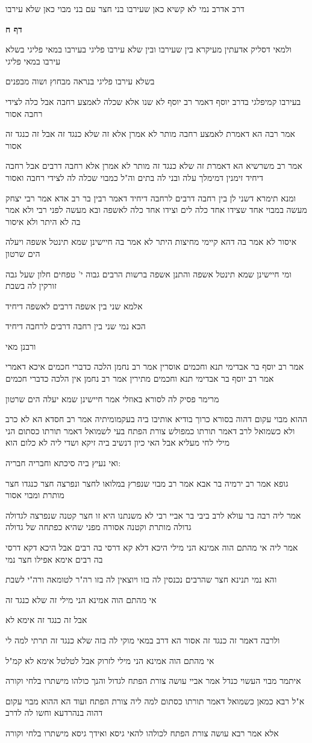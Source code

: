 \documentclass[12pt, openany]{book}
\newcommand{\sethebfont}{
\fontsize{10.5pt}{21.0pt} \selectfont
}
\newcommand{\textblock}[1]{
{\sethebfont #1\\}	
}
\newcommand{\sectname}{}
\newcommand{\newsection}[1]{
	\addcontentsline{toc}{section}{#1}
	\renewcommand{\sectname}{#1}	
	\vspace{-\baselineskip}
	\begin{center}
		\textbf{%
\fontsize{16pt}{16pt}\selectfont
			#1}
	\end{center}
	\vspace{-\baselineskip}
	\nopagebreak
}
\begin{document}
\textblock{דרב אדרב נמי לא קשיא כאן שעירבו בני חצר עם בני מבוי כאן שלא עירבו}
\newsection{דף ח}
\textblock{ולמאי דסליק אדעתין מעיקרא בין שעירבו ובין שלא עירבו פליגי בעירבו במאי פליגי בשלא עירבו במאי פליגי}
\textblock{בשלא עירבו פליגי בנראה מבחוץ ושוה מבפנים}
\textblock{בעירבו קמיפלגי בדרב יוסף דאמר רב יוסף לא שנו אלא שכלה לאמצע רחבה אבל כלה לצידי רחבה אסור}
\textblock{אמר רבה הא דאמרת לאמצע רחבה מותר לא אמרן אלא זה שלא כנגד זה אבל זה כנגד זה אסור}
\textblock{אמר רב משרשיא הא דאמרת זה שלא כנגד זה מותר לא אמרן אלא רחבה דרבים אבל רחבה דיחיד זימנין דמימלך עלה ובני לה בתים וה"ל כמבוי שכלה לה לצידי רחבה ואסור}
\textblock{ומנא תימרא דשני לן בין רחבה דרבים לרחבה דיחיד דאמר רבין בר רב אדא אמר רבי יצחק מעשה במבוי אחד שצידו אחד כלה לים וצידו אחד כלה לאשפה ובא מעשה לפני רבי ולא אמר בה לא היתר ולא איסור}
\textblock{איסור לא אמר בה דהא קיימי מחיצות היתר לא אמר בה חיישינן שמא תינטל אשפה ויעלה הים שרטון}
\textblock{ומי חיישינן שמא תינטל אשפה והתנן אשפה ברשות הרבים גבוה י' טפחים חלון שעל גבה זורקין לה בשבת}
\textblock{אלמא שני בין אשפה דרבים לאשפה דיחיד}
\textblock{הכא נמי שני בין רחבה דרבים לרחבה דיחיד}
\textblock{ורבנן מאי}
\textblock{אמר רב יוסף בר אבדימי תנא וחכמים אוסרין אמר רב נחמן הלכה כדברי חכמים איכא דאמרי אמר רב יוסף בר אבדימי תנא וחכמים מתירין אמר רב נחמן אין הלכה כדברי חכמים}
\textblock{מרימר פסיק לה לסורא באוזלי אמר חיישינן שמא יעלה הים שרטון}
\textblock{ההוא מבוי עקום דהוה בסורא כרוך בודיא אותיבו ביה בעקמומיתיה אמר רב חסדא הא לא כרב ולא כשמואל לרב דאמר תורתו כמפולש צורת הפתח בעי לשמואל דאמר תורתו כסתום הני מילי לחי מעליא אבל האי כיון דנשיב ביה זיקא ושדי ליה לא כלום הוא}
\textblock{ואי נעיץ ביה סיכתא וחבריה חבריה:}
\textblock{גופא אמר רב ירמיה בר אבא אמר רב מבוי שנפרץ במלואו לחצר ונפרצה חצר כנגדו חצר מותרת ומבוי אסור}
\textblock{אמר ליה רבה בר עולא לרב ביבי בר אביי רבי לא משנתנו היא זו חצר קטנה שנפרצה לגדולה גדולה מותרת וקטנה אסורה מפני שהיא כפתחה של גדולה}
\textblock{אמר ליה אי מהתם הוה אמינא הני מילי היכא דלא קא דרסי בה רבים אבל היכא דקא דרסי בה רבים אימא אפילו חצר נמי}
\textblock{והא נמי תנינא חצר שהרבים נכנסין לה בזו ויוצאין לה בזו רה"ר לטומאה ורה"י לשבת}
\textblock{אי מהתם הוה אמינא הני מילי זה שלא כנגד זה}
\textblock{אבל זה כנגד זה אימא לא}
\textblock{ולרבה דאמר זה כנגד זה אסור הא דרב במאי מוקי לה בזה שלא כנגד זה תרתי למה לי}
\textblock{אי מהתם הוה אמינא הני מילי לזרוק אבל לטלטל אימא לא קמ"ל}
\textblock{איתמר מבוי העשוי כנדל אמר אביי עושה צורת הפתח לגדול והנך כולהו מישתרו בלחי וקורה}
\textblock{א"ל רבא כמאן כשמואל דאמר תורתו כסתום למה ליה צורת הפתח ועוד הא ההוא מבוי עקום דהוה בנהרדעא וחשו לה לדרב}
\textblock{אלא אמר רבא עושה צורת הפתח לכולהו להאי גיסא ואידך גיסא מישתרו בלחי וקורה}
\end{document}
